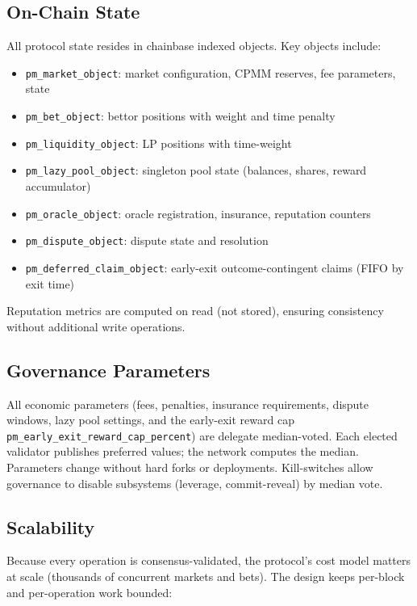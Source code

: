 \documentclass{ledger}
\theoremstyle{plain}
\theoremstyle{remark}
\begin{document}
\subsection{On-Chain State}\label{sec:onchainstate}

All protocol state resides in chainbase indexed objects. Key objects include:

\begin{itemize}
  \item \texttt{pm\_market\_object}: market configuration, CPMM reserves, fee parameters, state
  \item \texttt{pm\_bet\_object}: bettor positions with weight and time penalty
  \item \texttt{pm\_liquidity\_object}: LP positions with time-weight
  \item \texttt{pm\_lazy\_pool\_object}: singleton pool state (balances, shares, reward accumulator)
  \item \texttt{pm\_oracle\_object}: oracle registration, insurance, reputation counters
  \item \texttt{pm\_dispute\_object}: dispute state and resolution
  \item \texttt{pm\_deferred\_claim\_object}: early-exit outcome-contingent claims (FIFO by exit time)
\end{itemize}

Reputation metrics are computed on read (not stored), ensuring consistency
without additional write operations.

\subsection{Governance Parameters}\label{sec:governance}

All economic parameters (fees, penalties, insurance requirements, dispute
windows, lazy pool settings, and the early-exit reward cap
\texttt{pm\_early\_exit\_reward\_cap\_percent}) are delegate median-voted. Each
elected validator publishes preferred values; the network computes the median.
Parameters change without hard forks or deployments. Kill-switches allow
governance to disable subsystems (leverage, commit-reveal) by median vote.

\subsection{Scalability}\label{sec:scalability}

Because every operation is consensus-validated, the protocol's cost model
matters at scale (thousands of concurrent markets and bets). The design keeps
per-block and per-operation work bounded:
\end{document}
